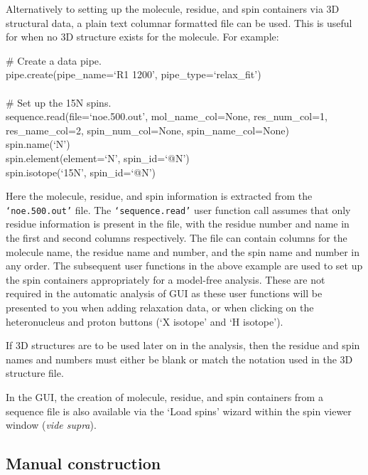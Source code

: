 Alternatively to setting up the molecule, residue, and spin containers via 3D structural data, a plain text columnar formatted file can be used.  This is useful for when no 3D structure exists for the molecule.  For example:

\begin{exampleenv}
\# Create a data pipe. \\
pipe.create(pipe\_name=`R1 1200', pipe\_type=`relax\_fit') \\
 \\
\# Set up the 15N spins. \\
sequence.read(file=`noe.500.out', mol\_name\_col=None, res\_num\_col=1, res\_name\_col=2, spin\_num\_col=None, spin\_name\_col=None) \\
spin.name(`N') \\
spin.element(element=`N', spin\_id=`@N') \\
spin.isotope(`15N', spin\_id=`@N')
\end{exampleenv}

Here the molecule, residue, and spin information is extracted from the \texttt{`noe.500.out'} file.  The \texttt{`sequence.read'} user function call assumes that only residue information is present in the file, with the residue number and name in the first and second columns respectively.  The file can contain columns for the molecule name, the residue name and number, and the spin name and number in any order.  The subsequent user functions in the above example are used to set up the spin containers appropriately for a model-free analysis.  These are not required in the automatic analysis of GUI as these user functions will be presented to you when adding relaxation data, or when clicking on the heteronucleus and proton buttons (`X isotope' and `H isotope').

If 3D structures are to be used later on in the analysis, then the residue and spin names and numbers must either be blank or match the notation used in the 3D structure file.

In the GUI, the creation of molecule, residue, and spin containers from a sequence file is also available via the `Load spins' wizard within the spin viewer window (\textit{vide supra}).



\subsection{Manual construction} \label{sect: script - manual construction}

